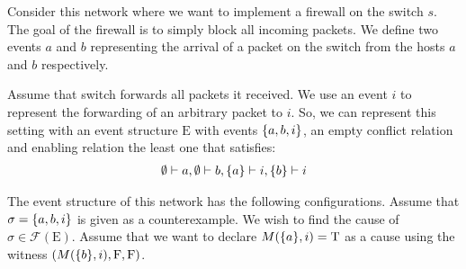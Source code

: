 \begin{frame}
    \begin{center}
    \end{center}
    Consider this network where we want to implement a firewall
    on the switch $s$.
    The goal of the firewall is to simply block all incoming packets.
    We define two events $a$ and $b$ representing the arrival of a packet
    on the switch from the hosts $a$ and $b$ respectively.
\end{frame}

\begin{frame}
    Assume that switch forwards all packets it received.
    We use an event $i$ to represent the forwarding of an arbitrary packet
    to $i$.
    So, we can represent this setting with an event structure $\mathrm{E}$
    with events $\{a,b,i\}$, an empty conflict relation and enabling relation
    the least one that satisfies:
    \begin{align*}
        \emptyset \vdash a, \emptyset \vdash b, \{a\} \vdash i, \{b\} \vdash i
    \end{align*}
\end{frame}

\begin{frame}
    The event structure of this network has the following configurations.
    Assume that $\sigma = \{a,b,i\}$ is given as a counterexample.
    We wish to find the cause of $\sigma \in \mathcal{F}(\mathrm{E})$.
    Assume that we want to declare $M(\{a\},i) = \mathrm{T}$ as a cause using
    the witness $(M(\{b\},i),\mathrm{F},\mathrm{F})$.
    \begin{center}
    \end{center}
\end{frame}

